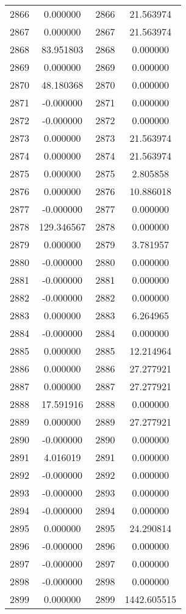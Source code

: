 \documentclass[12pt]{article}
\begin{document}
\begin{longtable}{@{}cccc@{}}
2866 & 0.000000 & 2866 & 21.563974 \\
2867 & 0.000000 & 2867 & 21.563974 \\
2868 & 83.951803 & 2868 & 0.000000 \\
2869 & 0.000000 & 2869 & 0.000000 \\
2870 & 48.180368 & 2870 & 0.000000 \\
2871 & -0.000000 & 2871 & 0.000000 \\
2872 & -0.000000 & 2872 & 0.000000 \\
2873 & 0.000000 & 2873 & 21.563974 \\
2874 & 0.000000 & 2874 & 21.563974 \\
2875 & 0.000000 & 2875 & 2.805858 \\
2876 & 0.000000 & 2876 & 10.886018 \\
2877 & -0.000000 & 2877 & 0.000000 \\
2878 & 129.346567 & 2878 & 0.000000 \\
2879 & 0.000000 & 2879 & 3.781957 \\
2880 & -0.000000 & 2880 & 0.000000 \\
2881 & -0.000000 & 2881 & 0.000000 \\
2882 & -0.000000 & 2882 & 0.000000 \\
2883 & 0.000000 & 2883 & 6.264965 \\
2884 & -0.000000 & 2884 & 0.000000 \\
2885 & 0.000000 & 2885 & 12.214964 \\
2886 & 0.000000 & 2886 & 27.277921 \\
2887 & 0.000000 & 2887 & 27.277921 \\
2888 & 17.591916 & 2888 & 0.000000 \\
2889 & 0.000000 & 2889 & 27.277921 \\
2890 & -0.000000 & 2890 & 0.000000 \\
2891 & 4.016019 & 2891 & 0.000000 \\
2892 & -0.000000 & 2892 & 0.000000 \\
2893 & -0.000000 & 2893 & 0.000000 \\
2894 & -0.000000 & 2894 & 0.000000 \\
2895 & 0.000000 & 2895 & 24.290814 \\
2896 & -0.000000 & 2896 & 0.000000 \\
2897 & -0.000000 & 2897 & 0.000000 \\
2898 & -0.000000 & 2898 & 0.000000 \\
2899 & 0.000000 & 2899 & 1442.605515 \\

\end{longtable}
\end{document}
